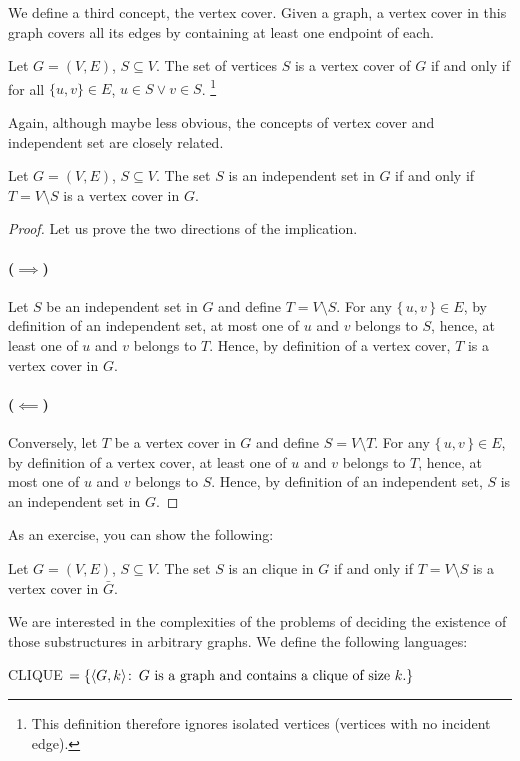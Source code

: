 We define a third concept, the vertex cover. Given a graph, a vertex cover in
this graph covers all its edges by containing at least one endpoint of each.
\begin{definition}
  Let $G=(V,E)$, $S\subseteq V$. The set of vertices $S$ is a vertex cover of
  $G$ if and only if for all $\{u,v\} \in E$, $u \in S \lor v \in S$.%
  \footnote{This definition therefore ignores isolated vertices
  (vertices with no incident edge).}
\end{definition}

Again, although maybe less obvious, the concepts of vertex cover and
independent set are closely related.
\begin{theorem}\label{is-vc}
  Let $G = (V,E)$, $S \subseteq V$. The set $S$ is an independent set in $G$ if
  and only if $T = V \setminus S$ is a vertex cover in $G$.
\end{theorem}

\begin{proof}
  Let us prove the two directions of the implication.
  \paragraph{($\implies$)}%
  Let $S$ be an independent set in $G$ and define $T = V \setminus S$.
  For any $\{\,u,v\,\} \in E$, by definition of an independent set, at most one
  of $u$ and $v$ belongs to $S$, hence, at least one of $u$ and $v$ belongs to
  $T$. Hence, by definition of a vertex cover, $T$ is a vertex cover in $G$.

  \paragraph{($\impliedby$)}%
  Conversely, let $T$ be a vertex cover in $G$ and define $S = V \setminus T$.
  For any $\{\,u,v\,\} \in E$, by definition of a vertex cover, at least one
  of $u$ and $v$ belongs to $T$, hence, at most one of $u$ and $v$ belongs to
  $S$. Hence, by definition of an independent set, $S$ is an independent set in
  $G$.
\end{proof}

As an exercise, you can show the following:
\begin{corollary}\label{vc-cl}
  Let $G = (V,E)$, $S \subseteq V$. The set $S$ is an clique in $G$ if
  and only if $T = V \setminus S$ is a vertex cover in $\bar{G}$.
\end{corollary}

We are interested in the complexities of the problems of deciding the existence
of those substructures in arbitrary graphs. We define the following languages:
\begin{definition}
  CLIQUE $= \{\langle G,k \rangle \colon\, \text{$G$ is a graph and contains a clique of size $k$.} \}$
\end{definition}

